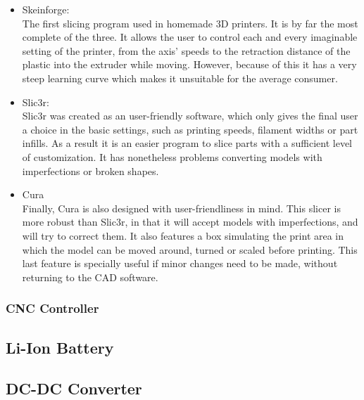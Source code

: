 		\begin{itemize}
		  
		  \item Skeinforge: \hfill \\
		  The first slicing program used in homemade 3D printers. It is by far the most complete of the three. It allows the user to control each and every imaginable setting of the printer, from the axis' speeds to the retraction distance of the plastic into the extruder while moving. However, because of this it has a very steep learning curve which makes it unsuitable for the average consumer.

		  \item Slic3r:  \hfill \\
		  Slic3r was created as an user-friendly software, which only gives the final user a choice in the basic settings, such as printing speeds, filament widths or part infills. As a result it is an easier program to slice parts with a sufficient level of customization. It has nonetheless problems converting models with imperfections or broken shapes.
		  
		  \item Cura \hfill \\
		  Finally, Cura is also designed with user-friendliness in mind. This slicer is more robust than Slic3r, in that it will accept models with imperfections, and will try to correct them. It also features a box simulating the print area in which the model can be moved around, turned or scaled before printing.
		  This last feature is specially useful if minor changes need to be made, without returning to the CAD software.
		
		\end{itemize}



	\subsubsection{CNC Controller}




\subsection{Li-Ion Battery}



\subsection{DC-DC Converter}



